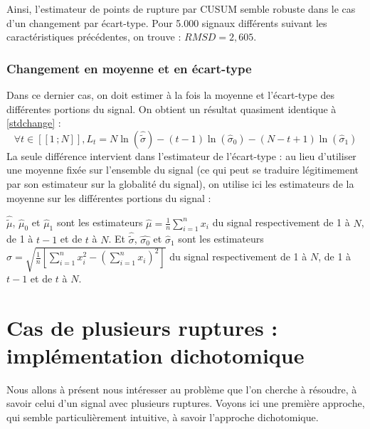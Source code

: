 \documentclass[french,11pt,notitlepage]{report}
\begin{document}
	Ainsi, l'estimateur de points de rupture par CUSUM semble robuste dans le cas d'un changement par écart-type. Pour 5.000 signaux différents suivant les caractéristiques précédentes, on trouve : $RMSD = 2,605$.
	
	
	\subsection{Changement en moyenne et en écart-type}
	
	
	Dans ce dernier cas, on doit estimer à la fois la moyenne et l'écart-type des différentes portions du signal. On obtient un résultat quasiment identique à \ref{stdchange} :
	\begin{equation}
		\forall t \in [\![1\,;N]\!], L_t = N\ln (\hat{\tilde\sigma}) - (t-1) \ln (\hat\sigma_0) - (N - t + 1) \ln (\hat\sigma_1)
		\label{bothchange}
	\end{equation}
	La seule différence intervient dans l'estimateur de l'écart-type :
	au lieu d'utiliser une moyenne fixée sur l'ensemble du signal (ce qui peut se traduire légitimement par son estimateur sur la globalité du signal),
	on utilise ici les estimateurs  de la moyenne sur les différentes portions du signal :
	
	$\hat{\tilde\mu}$, $\hat\mu_0$ et $\hat\mu_1$ sont les estimateurs $\hat\mu=\frac1n\sum_{i=1}^nx_i$ du signal respectivement de 1 à $N$, de 1 à $t-1$ et de $t$ à $N$.
	Et $\hat{\tilde\sigma}$, $\hat{\sigma_0}$ et $\hat\sigma_1$ sont les estimateurs $\hat\sigma=\sqrt{\frac1n\left[\sum_{i=1}^nx_i^2-(\sum_{i=1}^nx_i)^2\right]}$ du signal respectivement de 1 à $N$, de 1 à $t-1$ et de $t$ à $N$.	

	
	
	\chapter{Cas de plusieurs ruptures : implémentation dichotomique}
	Nous allons à présent nous intéresser au problème que l'on cherche à résoudre, à savoir celui d'un signal avec plusieurs ruptures. Voyons ici une première approche, qui semble particulièrement intuitive, à savoir l'approche dichotomique.
\end{document}
